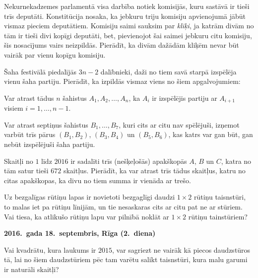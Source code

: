 \documentclass[11pt]{article}
\newcounter{alphnum}
\newenvironment{alphlist}{\begin{list}{(\Alph{alphnum})}{\usecounter{alphnum}\setlength{\leftmargin}{2.5em}} \rm}{\end{list}}
\begin{document}
\begin{problem}[BW.TST.2016.7]
Nekurnekadzemes parlamentā visa darbība notiek komisijās, kuru 
sastāvā ir tieši trīs deputāti. Konstitūcija nosaka, ka jebkuru triju 
komisiju apvienojumā jābūt vismaz pieciem deputātiem. 
Komisiju saimi sauksim par {\em kliķi}, ja katrām divām no tām 
ir tieši divi kopīgi deputāti, 
bet, pievienojot šai saimei jebkuru citu komisiju, šis nosacījums
vairs neizpildās. 
Pierādīt, ka divām dažādām kliķēm nevar būt vairāk par vienu kopīgu komisiju. 
\end{problem}

\begin{problem}[BW.TST.2016.8]
Šaha festivālā piedalījās $3n - 2$ dalībnieki, daži no tiem savā starpā izspēlēja vienu 
šaha partiju. Pierādīt, ka izpildās vismaz viens no šiem apgalvojumiem:
\begin{alphlist}
\item Var atrast tādus $n$ šahistus $A_1,A_2,\ldots,A_n$, ka $A_i$ ir izspēlējis partiju ar 
$A_{i+1}$ visiem $i = 1,\ldots,n-1$. 
\item Var atrast septiņus šahistus $B_1,\ldots,B_7$, kuri cits ar citu nav spēlējuši, izņemot 
varbūt trīs pārus $(B_1,B_2)$, $(B_3,B_4)$ un $(B_5,B_6)$, kas katrs var gan būt, 
gan nebūt izspēlējuši šaha partiju. 
\end{alphlist}
\end{problem}

\begin{problem}[BW.TST.2016.9]
Skaitļi no $1$ līdz $2016$ ir sadalīti trīs (nešķeļošās) apakškopās $A$, $B$ un $C$, 
katra no tām satur tieši $672$ skaitļus. 
Pierādīt, ka var atrast trīs tādus skaitļus, katru no citas apakškopas, ka divu 
no tiem summa ir vienāda ar trešo. 
\end{problem}

\begin{problem}[BW.TST.2016.10]
Uz bezgalīgas rūtiņu lapas ir novietoti bezgaglīgi daudzi $1 \times 2$ rūtiņu taisnstūri, 
to malas iet pa rūtiņu līnijām, un tie nesaskaras cits ar citu pat ne ar stūriem. 
Vai tiesa, ka atlikušo rūtiņu lapu var pilnībā noklāt ar $1 \times 2$ rūtiņu tainstūriem?
\end{problem}


\begin{center}
{\bf 2016.\ gada 18.\ septembris, Rīga (2.\ diena)}
\end{center}

\begin{problem}[BW.TST.2016.11]
Vai kvadrātu, kura laukums ir $2015$, var sagriezt ne vairāk kā piecos
daudzstūros tā, lai no šiem daudzstūriem pēc tam varētu salikt taisnstūri, kura malu garumi ir naturāli skaitļi? 
\end{problem}
\end{document}
